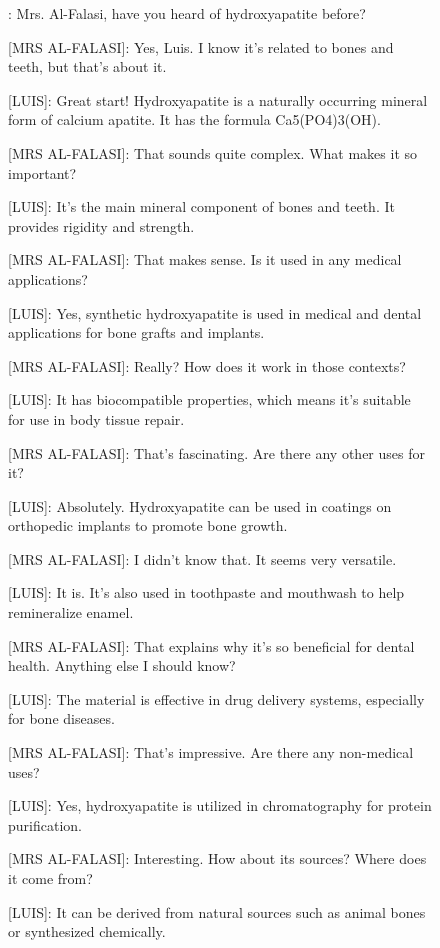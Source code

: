 \begin{figure}
    \centering
    \begin{tcolorbox}[width=\textwidth, colback=white, colframe=black, boxrule=0.8pt, fonttitle=\bfseries, title={Dialog example, daily life}]
[LUIS]: Mrs. Al-Falasi, have you heard of hydroxyapatite before?

[MRS AL-FALASI]: Yes, Luis. I know it's related to bones and teeth, but that's about it.

[LUIS]: Great start! Hydroxyapatite is a naturally occurring mineral form of calcium apatite. It has the formula Ca5(PO4)3(OH).

[MRS AL-FALASI]: That sounds quite complex. What makes it so important?

[LUIS]: It's the main mineral component of bones and teeth. It provides rigidity and strength.

[MRS AL-FALASI]: That makes sense. Is it used in any medical applications?

[LUIS]: Yes, synthetic hydroxyapatite is used in medical and dental applications for bone grafts and implants.

[MRS AL-FALASI]: Really? How does it work in those contexts?

[LUIS]: It has biocompatible properties, which means it's suitable for use in body tissue repair.

[MRS AL-FALASI]: That's fascinating. Are there any other uses for it?

[LUIS]: Absolutely. Hydroxyapatite can be used in coatings on orthopedic implants to promote bone growth.

[MRS AL-FALASI]: I didn't know that. It seems very versatile.

[LUIS]: It is. It's also used in toothpaste and mouthwash to help remineralize enamel.

[MRS AL-FALASI]: That explains why it's so beneficial for dental health. Anything else I should know?

[LUIS]: The material is effective in drug delivery systems, especially for bone diseases.

[MRS AL-FALASI]: That's impressive. Are there any non-medical uses?

[LUIS]: Yes, hydroxyapatite is utilized in chromatography for protein purification.

[MRS AL-FALASI]: Interesting. How about its sources? Where does it come from?

[LUIS]: It can be derived from natural sources such as animal bones or synthesized chemically.


\end{tcolorbox}
\end{figure}
